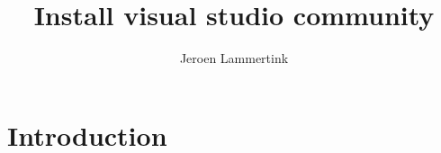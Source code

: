 \newcommand*{\BEAMERCLASS}{}


\title{Install visual studio community}
\author{Jeroen Lammertink}
\begin{frame}
\titlepage
\end{frame}
\section{Introduction}


